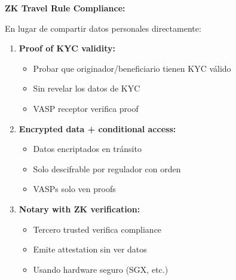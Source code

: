 \documentclass[11pt,a4paper,twoside]{book}
\theoremstyle{definition}
\theoremstyle{remark}
\begin{document}
\begin{keyidea}
\textbf{ZK Travel Rule Compliance:}

En lugar de compartir datos personales directamente:

\begin{enumerate}
    \item \textbf{Proof of KYC validity:}
    \begin{itemize}
        \item Probar que originador/beneficiario tienen KYC válido
        \item Sin revelar los datos de KYC
        \item VASP receptor verifica proof
    \end{itemize}
    
    \item \textbf{Encrypted data + conditional access:}
    \begin{itemize}
        \item Datos encriptados en tránsito
        \item Solo descifrable por regulador con orden
        \item VASPs solo ven proofs
    \end{itemize}
    
    \item \textbf{Notary with ZK verification:}
    \begin{itemize}
        \item Tercero trusted verifica compliance
        \item Emite attestation sin ver datos
        \item Usando hardware seguro (SGX, etc.)
    \end{itemize}
\end{enumerate}
\end{keyidea}
\end{document}
